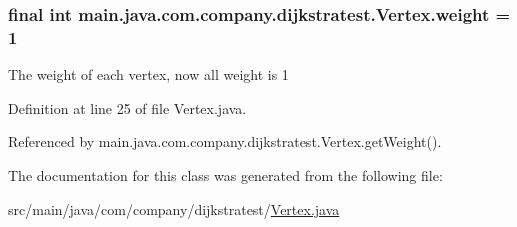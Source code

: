 \hypertarget{classmain_1_1java_1_1com_1_1company_1_1dijkstratest_1_1_vertex_a17e38182d49640463ff2a93a55dd12d8}{
\subsubsection[{weight}]{\setlength{\rightskip}{0pt plus 5cm}final int main.\-java.\-com.\-company.\-dijkstratest.\-Vertex.\-weight = 1\hspace{0.3cm}{\ttfamily [private]}}}\label{classmain_1_1java_1_1com_1_1company_1_1dijkstratest_1_1_vertex_a17e38182d49640463ff2a93a55dd12d8}
The weight of each vertex, now all weight is 1 

Definition at line 25 of file Vertex.\-java.



Referenced by main.\-java.\-com.\-company.\-dijkstratest.\-Vertex.\-get\-Weight().



The documentation for this class was generated from the following file\-:\begin{DoxyCompactItemize}
\item 
src/main/java/com/company/dijkstratest/\hyperlink{_vertex_8java}{Vertex.\-java}\end{DoxyCompactItemize}
